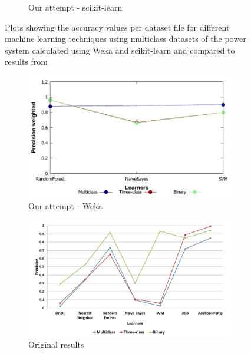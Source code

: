 \begin{figure}[H]
\begin{subfigure}[t]{110mm}
        \caption{Our attempt - scikit-learn}
    \end{subfigure}
    \caption{Plots showing the accuracy values per dataset file for different machine learning techniques using multiclass datasets of the power system calculated using Weka and scikit-learn and compared to results from \cite{borges_hink_machine_2014-1}}
    \label{fig:weka_accall}
\end{figure}

\begin{figure}[H]
    \centering
    \begin{subfigure}[t]{110mm}
        \includegraphics[width=\linewidth]{images/weka_precweight}
        \caption{Our attempt - Weka}
    \end{subfigure}
    \begin{subfigure}[t]{110mm}
        \includegraphics[width=\linewidth]{images/weka_precision_cite.png}
        \caption{Original results \cite{borges_hink_machine_2014-1}}
    \end{subfigure}
    \begin{subfigure}[t]{110mm}

\end{subfigure}
\end{figure}
